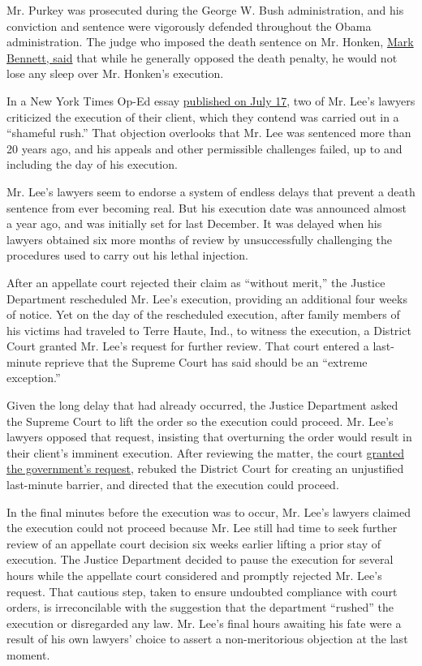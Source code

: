 Mr. Purkey was prosecuted during the George W. Bush administration, and
his conviction and sentence were vigorously defended throughout the
Obama administration. The judge who imposed the death sentence on Mr.
Honken,
\href{https://www.desmoinesregister.com/story/news/crime-and-courts/2020/07/17/judge-who-oversaw-dustin-honken-trial-says-evidence-overwhelming-dealth-penalty-iowa/5457829002/}{Mark
Bennett, said} that while he generally opposed the death penalty, he
would not lose any sleep over Mr. Honken's execution.

In a New York Times Op-Ed essay
\href{https://www.nytimes.com/2020/07/17/opinion/justice-department-federal-execution.html}{published
on July 17}, two of Mr. Lee's lawyers criticized the execution of their
client, which they contend was carried out in a ``shameful rush.'' That
objection overlooks that Mr. Lee was sentenced more than 20 years ago,
and his appeals and other permissible challenges failed, up to and
including the day of his execution.

Mr. Lee's lawyers seem to endorse a system of endless delays that
prevent a death sentence from ever becoming real. But his execution date
was announced almost a year ago, and was initially set for last
December. It was delayed when his lawyers obtained six more months of
review by unsuccessfully challenging the procedures used to carry out
his lethal injection.

After an appellate court rejected their claim as ``without merit,'' the
Justice Department rescheduled Mr. Lee's execution, providing an
additional four weeks of notice. Yet on the day of the rescheduled
execution, after family members of his victims had traveled to Terre
Haute, Ind., to witness the execution, a District Court granted Mr.
Lee's request for further review. That court entered a last-minute
reprieve that the Supreme Court has said should be an ``extreme
exception.''

Given the long delay that had already occurred, the Justice Department
asked the Supreme Court to lift the order so the execution could
proceed. Mr. Lee's lawyers opposed that request, insisting that
overturning the order would result in their client's imminent execution.
After reviewing the matter, the court
\href{https://www.nytimes.com/2020/07/13/us/politics/federal-execution.html}{granted
the government's request}, rebuked the District Court for creating an
unjustified last-minute barrier, and directed that the execution could
proceed.

In the final minutes before the execution was to occur, Mr. Lee's
lawyers claimed the execution could not proceed because Mr. Lee still
had time to seek further review of an appellate court decision six weeks
earlier lifting a prior stay of execution. The Justice Department
decided to pause the execution for several hours while the appellate
court considered and promptly rejected Mr. Lee's request. That cautious
step, taken to ensure undoubted compliance with court orders, is
irreconcilable with the suggestion that the department ``rushed'' the
execution or disregarded any law. Mr. Lee's final hours awaiting his
fate were a result of his own lawyers' choice to assert a
non-meritorious objection at the last moment.

